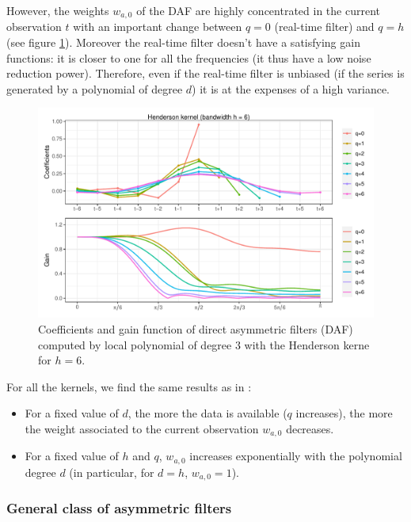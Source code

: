 \documentclass[
  12pt,
  ,
  a4paper]{article}
\newcommand\1{\mathds{1}}
\begin{document}
However, the weights \(w_{a,0}\) of the DAF are highly concentrated in the current observation \(t\) with an important change between \(q=0\) (real-time filter) and \(q=h\) (see figure \ref{fig:filtersdafcoefs}).
Moreover the real-time filter doesn't have a satisfying gain functions: it is closer to one for all the frequencies (it thus have a low noise reduction power).
Therefore, even if the real-time filter is unbiased (if the series is generated by a polynomial of degree \(d\)) it is at the expenses of a high variance.

\begin{figure}[!ht]
\includegraphics[width=\textwidth]{img/daf/coef_gain_1}
\caption{Coefficients and gain function of direct asymmetric filters (DAF) computed by local polynomial of degree $3$ with the Henderson kerne for $h=6$.}\label{fig:filtersdafcoefs}\footnotesize
\end{figure}

For all the kernels, we find the same results as in \textcite{proietti2008}:

\begin{itemize}
\item
  For a fixed value of \(d\), the more the data is available (\(q\) increases), the more the weight associated to the current observation \(w_{a,0}\) decreases.
\item
  For a fixed value of \(h\) and \(q\), \(w_{a,0}\) increases exponentially with the polynomial degree \(d\) (in particular, for \(d=h\), \(w_{a,0}=1\)).
\end{itemize}

\hypertarget{general-class-of-asymmetric-filters}{%
\subsubsection{General class of asymmetric filters}\label{general-class-of-asymmetric-filters}}
\end{document}
